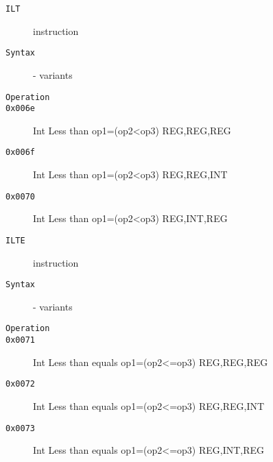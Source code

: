 \clearpage
\begin{description}
\item[\texttt{ILT}] instruction\\
\item[\texttt{Syntax}] - variants\\

\item[\texttt{Operation}]
\item[\texttt{}]
\item[\texttt{0x006e}] Int Less than op1=(op2<op3)  {REG,REG,REG}       \\
\item[\texttt{0x006f}] Int Less than op1=(op2<op3)  {REG,REG,INT}       \\
\item[\texttt{0x0070}] Int Less than op1=(op2<op3)  {REG,INT,REG}       \\
\end{description}
\clearpage
\begin{description}
\item[\texttt{ILTE}] instruction\\
\item[\texttt{Syntax}] - variants\\

\item[\texttt{Operation}]
\item[\texttt{}]
\item[\texttt{0x0071}] Int Less than equals op1=(op2<=op3)  {REG,REG,REG}       \\
\item[\texttt{0x0072}] Int Less than equals op1=(op2<=op3)  {REG,REG,INT}       \\
\item[\texttt{0x0073}] Int Less than equals op1=(op2<=op3)  {REG,INT,REG}       \\
\end{description}

